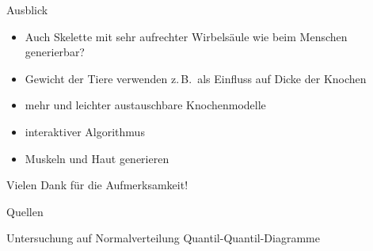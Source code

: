\documentclass{beamer}
\newcommand{\zb}{z.\,B.\ }
\begin{document}
\begin{frame}{Ausblick}
 \begin{itemize}
  \item Auch Skelette mit sehr aufrechter Wirbelsäule wie beim Menschen generierbar?
  \item Gewicht der Tiere verwenden \zb als Einfluss auf Dicke der Knochen
  \item mehr und leichter austauschbare Knochenmodelle
  \item interaktiver Algorithmus
  \item Muskeln und Haut generieren
 \end{itemize}
\end{frame}


\begin{frame}[focus]
 Vielen Dank für die Aufmerksamkeit!
\end{frame}

\appendix
\begin{frame}[shrink=5]{Quellen}
 \printbibliography[heading=bibintoc]
\end{frame}

\begin{frame}{Untersuchung auf Normalverteilung}
 Quantil-Quantil-Diagramme
  \begin{figure}
  ~
  ~
 \end{figure}
\end{frame}
\end{document}
